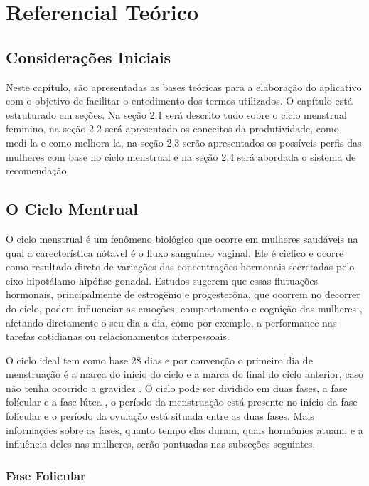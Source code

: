 \chapter[Referencial Teórico]{Referencial Teórico}

\section{Considerações Iniciais}

Neste capítulo, são apresentadas as bases teóricas para a elaboração do aplicativo com o objetivo de facilitar o entedimento dos termos utilizados. O capítulo está estruturado em seções. Na seção 2.1 será descrito tudo sobre o ciclo menstrual feminino, na seção 2.2 será apresentado os conceitos da produtividade, como medi-la e como melhora-la, na seção 2.3 serão apresentados os possíveis perfis das mulheres com base no ciclo menstrual e na seção 2.4 será abordada o sistema de recomendação.

\section{O Ciclo Mentrual}

O ciclo menstrual é um fenômeno biológico que ocorre em mulheres saudáveis na qual a carecterística nótavel é o fluxo sanguíneo vaginal\cite{guyton2012}. Ele é ciclico e ocorre como resultado direto de variações das concentrações hormonais secretadas pelo eixo hipotálamo-hipófise-gonadal. Estudos sugerem que essas flutuações hormonais, principalmente de estrogênio e progesterôna, que ocorrem no decorrer do ciclo, podem influenciar as emoções, comportamento e cognição das mulheres \cite{poroma2014}, afetando diretamente o seu dia-a-dia, como por exemplo, a performance nas tarefas cotidianas ou relacionamentos interpessoais.

O ciclo ideal tem como base 28 dias e por convenção o primeiro dia de menstruação é a marca do início do ciclo e a marca do final do ciclo anterior, caso não tenha ocorrido a gravidez \cite{lenton1984a}. O ciclo pode ser dividido em duas fases, a fase folícular e a fase lútea \cite{brondin2008}, o período da menstruação está presente no início da fase folícular e o período da ovulação está situada entre as duas fases. Mais informações sobre as fases, quanto tempo elas duram, quais hormônios atuam, e a influência deles nas mulheres, serão pontuadas nas subseções seguintes. 

\subsection{Fase Folicular}

